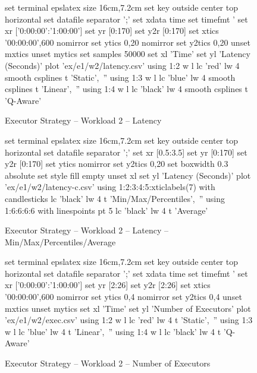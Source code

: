 \begin{figure}[!htbp]
	\centering
	\begin{minipage}[h]{\linewidth}
		\centering
		\begin{gnuplot}[terminal=epslatex, terminaloptions=color colortext]
			set terminal epslatex size 16cm,7.2cm
			set key outside center top horizontal
			set datafile separator ';'
			set xdata time
			set timefmt '%
			set xr ['0:00:00':'1:00:00']
			set yr [0:170]
			set y2r [0:170]
			set xtics '00:00:00',600 nomirror
			set ytics 0,20 nomirror
			set y2tics 0,20
			unset mxtics
			unset mytics
			set samples 50000 
			set xl 'Time'
			set yl 'Latency (Seconds)'
			plot 'ex/e1/w2/latency.csv' using 1:2 w l lc 'red' lw 4 smooth csplines t 'Static',\
			'' using 1:3 w l lc 'blue' lw 4 smooth csplines t 'Linear',\
			'' using 1:4 w l lc 'black' lw 4 smooth csplines t 'Q-Aware'
		\end{gnuplot}
		\caption{Executor Strategy -- Workload 2 -- Latency}
		\label{eval:f:e1:w2:lat}
	\end{minipage}\hfil
	\begin{minipage}[h]{\linewidth}
		\centering
		\begin{gnuplot}[terminal=epslatex, terminaloptions=color colortext]
			set terminal epslatex size 16cm,7.2cm
			set key outside center top horizontal
			set datafile separator ';'
			set xr [0.5:3.5]
			set yr [0:170]
			set y2r [0:170]
			set ytics nomirror
			set y2tics 0,20
			set boxwidth 0.3 absolute
			set style fill empty
			unset xl
			set yl 'Latency (Seconds)'
			plot 'ex/e1/w2/latency-c.csv' using 1:2:3:4:5:xticlabels(7) with candlesticks lc 'black' lw 4 t 'Min/Max/Percentiles',\
			'' using 1:6:6:6:6 with linespoints pt 5 lc 'black' lw 4 t 'Average' 
		\end{gnuplot}
		\caption{Executor Strategy -- Workload 2 -- Latency -- Min/Max/Percentiles/Average}
		\label{eval:f:e1:w2:lat-c}
	\end{minipage}\hfil
	\begin{minipage}[h]{\linewidth}
		\centering
		\begin{gnuplot}[terminal=epslatex, terminaloptions=color colortext]
			set terminal epslatex size 16cm,7.2cm
			set key outside center top horizontal
			set datafile separator ';'
			set xdata time
			set timefmt '%
			set xr ['0:00:00':'1:00:00']
			set yr [2:26]
			set y2r [2:26]
			set xtics '00:00:00',600 nomirror
			set ytics 0,4 nomirror
			set y2tics 0,4
			unset mxtics
			unset mytics
			set xl 'Time'
			set yl 'Number of Executors'
			plot 'ex/e1/w2/exec.csv' using 1:2 w l lc 'red' lw 4 t 'Static',\
			'' using 1:3 w l lc 'blue' lw 4 t 'Linear',\
			'' using 1:4 w l lc 'black' lw 4 t 'Q-Aware'
		\end{gnuplot}
		\caption{Executor Strategy -- Workload 2 -- Number of Executors}
		\label{eval:f:e1:w2:exec}
	\end{minipage}
\end{figure}
